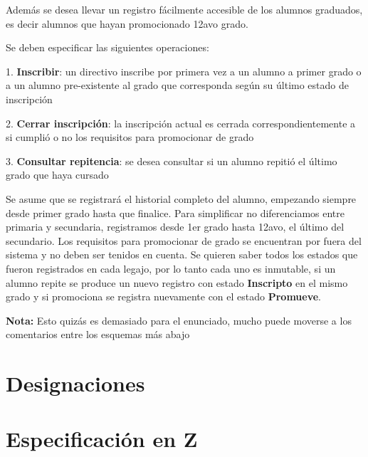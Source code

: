\documentclass{article}
\begin{document}
Además se desea llevar un registro fácilmente accesible de los alumnos graduados, es decir alumnos que hayan promocionado 12avo grado.

Se deben especificar las siguientes operaciones:

1. \textbf{Inscribir}: un directivo inscribe por primera vez a un alumno a primer grado o a un alumno pre-existente al grado que corresponda según su último estado de inscripción

2. \textbf{Cerrar inscripción}: la inscripción actual es cerrada correspondientemente a si cumplió o no los requisitos para promocionar de grado

3. \textbf{Consultar repitencia}: se desea consultar si un alumno repitió el último grado que haya cursado

Se asume que se registrará el historial completo del alumno, empezando siempre desde primer grado hasta que finalice.
Para simplificar no diferenciamos entre primaria y secundaria, registramos desde 1er grado hasta 12avo, el último del secundario. Los requisitos para promocionar de grado se encuentran por fuera del sistema y no deben ser tenidos en cuenta.
Se quieren saber todos los estados que fueron registrados en cada legajo, por lo tanto cada uno es inmutable, si un alumno repite se produce un nuevo registro con estado \textbf{Inscripto} en el mismo grado y si promociona se registra nuevamente con el estado \textbf{Promueve}.

\textbf{Nota:} Esto quizás es demasiado para el enunciado, mucho puede moverse a los comentarios entre los esquemas más abajo

\section*{Designaciones}

\section*{Especificación en Z}

\end{document}
